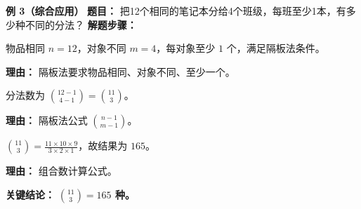 \begin{examplebox}
	\medskip
	\textbf{\textcolor{CExample}{例 3（综合应用）}}
	\textbf{\textcolor{CExample}{题目：}}
	把12个相同的笔记本分给4个班级，每班至少1本，有多少种不同的分法？
	\textbf{\textcolor{CExample}{解题步骤：}}
	\begin{description}[style=nextline, leftmargin=2.8em, labelsep=0.5em, itemsep=0.45em]
		\item[\textbf{第一步（验证条件）：}]
			物品相同 $n=12$，对象不同 $m=4$，每对象至少 $1$ 个，满足隔板法条件。 \par \textbf{理由：} 隔板法要求物品相同、对象不同、至少一个。
		\item[\textbf{第二步（套用公式）：}]
			分法数为 $\displaystyle \binom{12-1}{4-1} = \binom{11}{3}$。 \par \textbf{理由：} 隔板法公式 $\binom{n-1}{m-1}$。
		\item[\textbf{第三步（计算）：}]
			$\displaystyle \binom{11}{3} = \frac{11 \times 10 \times 9}{3 \times 2 \times 1}$，故结果为 $165$。 \par \textbf{理由：} 组合数计算公式。
	\end{description}
	\textbf{\textcolor{CExample}{关键结论：}}
	\textbf{$\displaystyle \binom{11}{3} = 165$ 种。}
\end{examplebox}

